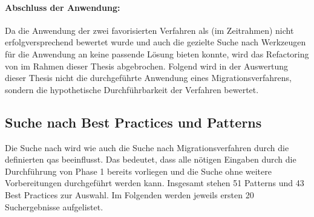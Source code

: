 \paragraph{Abschluss der Anwendung:} Da die Anwendung der zwei favorisierten Verfahren als (im Zeitrahmen) nicht erfolgversprechend bewertet wurde und auch die gezielte Suche nach Werkzeugen für die Anwendung an \jf keine passende Lösung bieten konnte, wird das Refactoring von \jf im Rahmen dieser Thesis abgebrochen.
Folgend wird in der Auswertung dieser Thesis nicht die durchgeführte Anwendung eines Migrationsverfahrens, sondern die hypothetische Durchführbarkeit der Verfahren bewertet.

\subsection{Suche nach Best Practices und Patterns}

Die Suche nach \bpp wird wie auch die Suche nach Migrationsverfahren durch die definierten \glspl{qa} beeinflusst.
Das bedeutet, dass alle nötigen Eingaben durch die Durchführung von Phase 1 bereits vorliegen und die Suche ohne weitere Vorbereitungen durchgeführt werden kann.
Insgesamt stehen 51 Patterns und 43 Best Practices zur Auswahl.
Im Folgenden werden jeweils ersten 20 Suchergebnisse aufgelistet.


